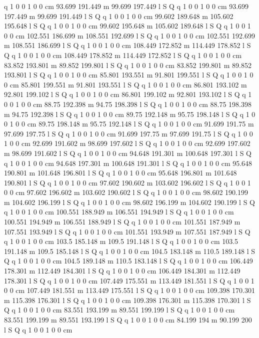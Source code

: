 q 1 0 0 1 0 0 cm
93.699 191.449 m 99.699 197.449 l S Q
q 1 0 0 1 0 0 cm
93.699 197.449 m 99.699 191.449 l S Q
q 1 0 0 1 0 0 cm
99.602 189.648 m 105.602 195.648 l S Q
q 1 0 0 1 0 0 cm
99.602 195.648 m 105.602 189.648 l S Q
q 1 0 0 1 0 0 cm
102.551 186.699 m 108.551 192.699 l S Q
q 1 0 0 1 0 0 cm
102.551 192.699 m 108.551 186.699 l S Q
q 1 0 0 1 0 0 cm
108.449 172.852 m 114.449 178.852 l S Q
q 1 0 0 1 0 0 cm
108.449 178.852 m 114.449 172.852 l S Q
q 1 0 0 1 0 0 cm
83.852 193.801 m 89.852 199.801 l S Q
q 1 0 0 1 0 0 cm
83.852 199.801 m 89.852 193.801 l S Q
q 1 0 0 1 0 0 cm
85.801 193.551 m 91.801 199.551 l S Q
q 1 0 0 1 0 0 cm
85.801 199.551 m 91.801 193.551 l S Q
q 1 0 0 1 0 0 cm
86.801 193.102 m 92.801 199.102 l S Q
q 1 0 0 1 0 0 cm
86.801 199.102 m 92.801 193.102 l S Q
q 1 0 0 1 0 0 cm
88.75 192.398 m 94.75 198.398 l S Q
q 1 0 0 1 0 0 cm
88.75 198.398 m 94.75 192.398 l S Q
q 1 0 0 1 0 0 cm
89.75 192.148 m 95.75 198.148 l S Q
q 1 0 0 1 0 0 cm
89.75 198.148 m 95.75 192.148 l S Q
q 1 0 0 1 0 0 cm
91.699 191.75 m 97.699 197.75 l S Q
q 1 0 0 1 0 0 cm
91.699 197.75 m 97.699 191.75 l S Q
q 1 0 0 1 0 0 cm
92.699 191.602 m 98.699 197.602 l S Q
q 1 0 0 1 0 0 cm
92.699 197.602 m 98.699 191.602 l S Q
q 1 0 0 1 0 0 cm
94.648 191.301 m 100.648 197.301 l S Q
q 1 0 0 1 0 0 cm
94.648 197.301 m 100.648 191.301 l S Q
q 1 0 0 1 0 0 cm
95.648 190.801 m 101.648 196.801 l S Q
q 1 0 0 1 0 0 cm
95.648 196.801 m 101.648 190.801 l S Q
q 1 0 0 1 0 0 cm
97.602 190.602 m 103.602 196.602 l S Q
q 1 0 0 1 0 0 cm
97.602 196.602 m 103.602 190.602 l S Q
q 1 0 0 1 0 0 cm
98.602 190.199 m 104.602 196.199 l S Q
q 1 0 0 1 0 0 cm
98.602 196.199 m 104.602 190.199 l S Q
q 1 0 0 1 0 0 cm
100.551 188.949 m 106.551 194.949 l S Q
q 1 0 0 1 0 0 cm
100.551 194.949 m 106.551 188.949 l S Q
q 1 0 0 1 0 0 cm
101.551 187.949 m 107.551 193.949 l S Q
q 1 0 0 1 0 0 cm
101.551 193.949 m 107.551 187.949 l S Q
q 1 0 0 1 0 0 cm
103.5 185.148 m 109.5 191.148 l S Q
q 1 0 0 1 0 0 cm
103.5 191.148 m 109.5 185.148 l S Q
q 1 0 0 1 0 0 cm
104.5 183.148 m 110.5 189.148 l S Q
q 1 0 0 1 0 0 cm
104.5 189.148 m 110.5 183.148 l S Q
q 1 0 0 1 0 0 cm
106.449 178.301 m 112.449 184.301 l S Q
q 1 0 0 1 0 0 cm
106.449 184.301 m 112.449 178.301 l S Q
q 1 0 0 1 0 0 cm
107.449 175.551 m 113.449 181.551 l S Q
q 1 0 0 1 0 0 cm
107.449 181.551 m 113.449 175.551 l S Q
q 1 0 0 1 0 0 cm
109.398 170.301 m 115.398 176.301 l S Q
q 1 0 0 1 0 0 cm
109.398 176.301 m 115.398 170.301 l S Q
q 1 0 0 1 0 0 cm
83.551 193.199 m 89.551 199.199 l S Q
q 1 0 0 1 0 0 cm
83.551 199.199 m 89.551 193.199 l S Q
q 1 0 0 1 0 0 cm
84.199 194 m 90.199 200 l S Q
q 1 0 0 1 0 0 cm
